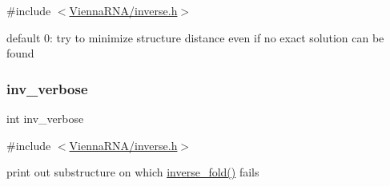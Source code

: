{\ttfamily \#include $<$\mbox{\hyperlink{inverse_8h}{Vienna\+R\+N\+A/inverse.\+h}}$>$}

default 0\+: try to minimize structure distance even if no exact solution can be found \mbox{\label{group__inverse__fold_gafcfc65fba01b9cca5946726ed9057a63}} 
\subsubsection{\texorpdfstring{inv\_verbose}{inv\_verbose}}
{\footnotesize\ttfamily int inv\+\_\+verbose}



{\ttfamily \#include $<$\mbox{\hyperlink{inverse_8h}{Vienna\+R\+N\+A/inverse.\+h}}$>$}

print out substructure on which \mbox{\hyperlink{group__inverse__fold_ga7af026de55d4babad879f2c92559cbbc}{inverse\+\_\+fold()}} fails 